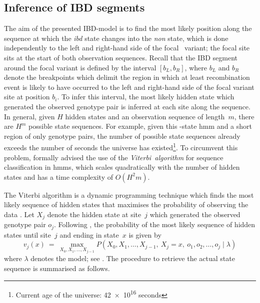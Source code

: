 %
\subsection{Inference of IBD segments}
%

The aim of the presented IBD-model is to find the most likely position along the sequence at which the \emph{ibd} state changes into the \emph{non} state, which is done independently to the left and right-hand side of the focal \fk{}~variant; \ie the focal site sits at the start of both observation sequences.
Recall that the IBD segment around the focal variant is defined by the interval ${[b_L, b_R]}$, where $b_L$ and $b_R$ denote the breakpoints which delimit the region in which at least  recombination event is likely to have occurred to the left and right-hand side of the focal variant site at position $b_i$.
To infer this interval, the most likely hidden state which generated the observed genotype pair is inferred at each site along the sequence.
In general, given ${H}$ hidden states and an observation sequence of length~$m$, there are $H^m$ possible state sequences.
For example, given this -state \gls{hmm} and a short region of only  genotype pairs, the number of possible state sequences already exceeds the number of seconds the universe has existed\footnote{Current age of the universe: \num{42e16} seconds }.
To circumvent this problem, \citet{Rabiner:1989hs} formally advised the use of the \emph{Viterbi~algorithm} for sequence classification in \glspl{hmm}, which scales quadratically with the number of hidden states and has a time complexity of ${O(H^2 m)}$.

%
%

The Viterbi algorithm is a dynamic programming technique which finds the most likely sequence of hidden states that maximises the probability of observing the data \citep{Viterbi:1967hq,Forney:1973dt}.
Let $X_j$ denote the hidden state at site~$j$ which generated the observed genotype pair $o_j$.
Following \citet{Rabiner:1989hs}, the probability of the most likely sequence of hidden states until site~$j$ and ending in state~$x$ is given by
\begin{equation}\label{eq:viterbi_main}
	v_j(x) ~=~ \max_{X_0, X_1, \ldots, X_{j-1}} P(X_0, X_1, \ldots, X_{j-1},~ X_j = x,~ o_1, o_2, \ldots, o_j \mid \lambda)
\end{equation}
where $\lambda$ denotes the model; see .
The procedure to retrieve the actual state sequence is summarised as follows.

